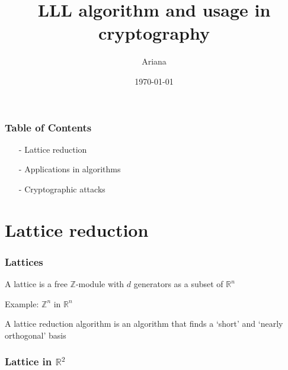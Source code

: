 \documentclass{beamer}
\title{LLL algorithm and usage in cryptography}
\institute{libgen/scihub}
\author{Ariana}
\date{\today}
\begin{document}
	
\frame{\titlepage}

\begin{frame}
	\frametitle{Table of Contents}
	\begin{itemize}
		\item[-]Lattice reduction
		\item[]
		\item[-]Applications in algorithms
		\item[]
		\item[-]Cryptographic attacks
		\item[]
	\end{itemize}
\end{frame}

\section{Lattice reduction}

\begin{frame}
	\frametitle{Lattices}
    A lattice is a free $\mathbb Z$-module with $d$ generators as a subset of $\mathbb R^n$

    Example: $\mathbb Z^n$ in $\mathbb R^n$\pause

    A lattice reduction algorithm is an algorithm that finds a `short' and `nearly orthogonal' basis
\end{frame}

\begin{frame}
    \frametitle{Lattice in $\mathbb R^2$}
    \begin{center}
    \end{center}
\end{frame}
\end{document}
